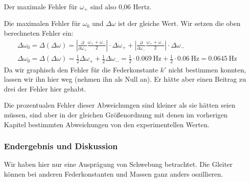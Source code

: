 \documentclass{article}
\begin{document}
                  Der maximale Fehler für \(\omega_{+} \) sind also 0,06 Hertz.

                  Die maximalen Fehler für \(\omega_0\) und \(\Delta \omega \) ist der gleiche Wert. Wir setzen die oben berechneten Fehler ein:
                  \begin{equation}
                      \begin{gathered}
                          \Delta \omega_0 = \Delta (\Delta \omega) = \left| \frac{\partial}{\partial \omega_{+}} \frac{\omega_{+} + \omega_{-}}{2} \right| \cdot \Delta \omega_{+} + \left| \frac{\partial}{\partial \omega_{-}} \frac{\omega_{+} + \omega_{-}}{2} \right| \cdot \Delta \omega_{-} \\
                          \Delta \omega_0 = \Delta (\Delta \omega) = \frac{1}{2} \Delta \omega_{+} + \frac{1}{2} \Delta \omega_{-} = \frac{1}{2} \cdot \SI{0.069}{\hertz} + \frac{1}{2} \cdot \SI{0.06}{\hertz} = \SI{0.0645}{\hertz}
                      \end{gathered} %
                  \end{equation}
                  Da wir graphisch den Fehler für die Federkonstante \(k'\) nicht bestimmen konnten, lassen wir ihn hier weg (nehmen ihn als Null an). Er hätte aber einen Beitrag zu drei der Fehler hier gehabt.

                  Die prozentualen Fehler dieser Abweichungen sind kleiner als sie hätten seien müssen,
                  sind aber in der gleichen Größenordnung mit denen im vorherigen Kapitel bestimmten Abweichungen von den experimentellen Werten.

          \subsubsection{Endergebnis und Diskussion}

              Wir haben hier nur eine Ausprägung von Schwebung betrachtet.
              Die Gleiter können bei anderen Federkonstanten und Massen ganz anders oszillieren.
\end{document}
